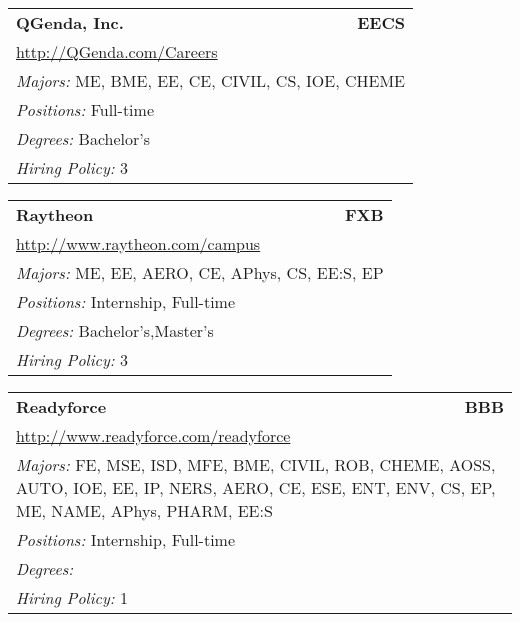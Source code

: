 \documentclass[twoside]{article}
\begin{document}
\begin{center}
\begin{multicols}{3}
\begin{FlushLeft}
\begin{minipage}{\columnwidth}
\end{minipage}
 
\begin{minipage}{\columnwidth}\begin{tabularx}{.95\columnwidth}{Xr}
                 {\Large\bf QGenda, Inc.} & {\Large\bf EECS}\\
    \multicolumn{2}{p{.95\columnwidth}}{\url{http://QGenda.com/Careers}}\\
    \multicolumn{2}{p{.95\columnwidth}}{\emph{Majors:} ME, BME, EE, CE, CIVIL, CS, IOE, CHEME}\\
    \multicolumn{2}{p{.95\columnwidth}}{\emph{Positions:} Full-time}\\
    \multicolumn{2}{p{.95\columnwidth}}{\emph{Degrees:} Bachelor's}\\
    \multicolumn{2}{p{.95\columnwidth}}{\emph{Hiring Policy:} 3}\\
    \end{tabularx}
    
\end{minipage}
 
\begin{minipage}{\columnwidth}\begin{tabularx}{.95\columnwidth}{Xr}
                 {\Large\bf Raytheon} & {\Large\bf FXB}\\
    \multicolumn{2}{p{.95\columnwidth}}{\url{http://www.raytheon.com/campus}}\\
    \multicolumn{2}{p{.95\columnwidth}}{\emph{Majors:} ME, EE, AERO, CE, APhys, CS, EE:S, EP}\\
    \multicolumn{2}{p{.95\columnwidth}}{\emph{Positions:} Internship, Full-time}\\
    \multicolumn{2}{p{.95\columnwidth}}{\emph{Degrees:} Bachelor's,Master's}\\
    \multicolumn{2}{p{.95\columnwidth}}{\emph{Hiring Policy:} 3}\\
    \end{tabularx}
    
\end{minipage}
 
\begin{minipage}{\columnwidth}\begin{tabularx}{.95\columnwidth}{Xr}
                 {\Large\bf Readyforce} & {\Large\bf BBB}\\
    \multicolumn{2}{p{.95\columnwidth}}{\url{http://www.readyforce.com/readyforce}}\\
    \multicolumn{2}{p{.95\columnwidth}}{\emph{Majors:} FE, MSE, ISD, MFE, BME, CIVIL, ROB, CHEME, AOSS, AUTO, IOE, EE, IP, NERS, AERO, CE, ESE, ENT, ENV, CS, EP, ME, NAME, APhys, PHARM, EE:S}\\
    \multicolumn{2}{p{.95\columnwidth}}{\emph{Positions:} Internship, Full-time}\\
    \multicolumn{2}{p{.95\columnwidth}}{\emph{Degrees:} }\\
    \multicolumn{2}{p{.95\columnwidth}}{\emph{Hiring Policy:} 1}\\
    \end{tabularx}
    

\end{minipage}
\end{FlushLeft}
\end{multicols}
\end{center}
\end{document}
